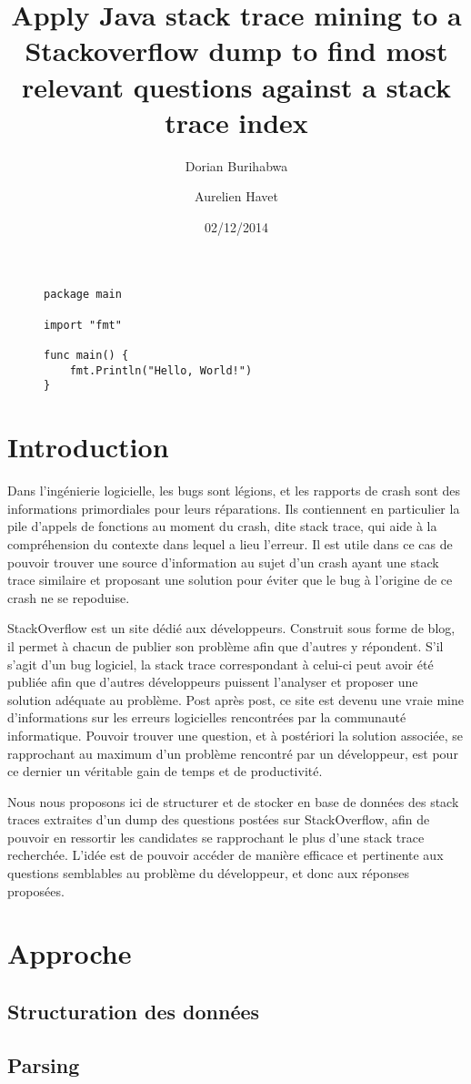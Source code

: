 \documentclass[11pt,a4paper]{article}
\author{Dorian Burihabwa \and Aurelien Havet}
\title{Apply Java stack trace mining to a Stackoverflow dump to find most relevant questions against a stack trace index}
\date{02/12/2014}
\begin{document}
\maketitle
\tableofcontents
\begin{figure}[h]
\begin{lstlisting}
package main

import "fmt"

func main() {
	fmt.Println("Hello, World!")
}
\end{lstlisting}
\end{figure}
\section{Introduction}
Dans l'ingénierie logicielle, les bugs sont légions, et les rapports de crash sont des informations primordiales pour leurs réparations. Ils contiennent en particulier la pile d'appels de fonctions au moment du crash, dite stack trace, qui aide à la compréhension du contexte dans lequel a lieu l'erreur. Il est utile dans ce cas de pouvoir trouver une source d'information au sujet d'un crash ayant une stack trace similaire et proposant une solution pour éviter que le bug à l'origine de ce crash ne se repoduise.

StackOverflow\cite{SO} est un site dédié aux développeurs. Construit sous forme de blog, il permet à chacun de publier son problème afin que d'autres y répondent. S'il s'agit d'un bug logiciel, la stack trace correspondant à celui-ci peut avoir été publiée afin que d'autres développeurs puissent l'analyser et proposer une solution adéquate au problème. Post après post, ce site est devenu une vraie mine d'informations sur les erreurs logicielles rencontrées par la communauté informatique. Pouvoir trouver une question, et à postériori la solution associée, se rapprochant au maximum d'un problème rencontré par un développeur, est pour ce dernier un véritable gain de temps et de productivité.
\newline

Nous nous proposons ici de structurer et de stocker en base de données des stack traces extraites d'un dump des questions postées sur StackOverflow, afin de pouvoir en ressortir les candidates se rapprochant le plus d'une stack trace recherchée. L'idée est de pouvoir accéder de manière efficace et pertinente aux questions semblables au problème du développeur, et donc aux réponses proposées.
\section{Approche}
\subsection{Structuration des données}
\subsection{Parsing}


\end{document}
